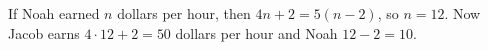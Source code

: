 If Noah earned $n$ dollars per hour, then $4n+2=5(n-2)$, so $n=12$. Now Jacob earns $4\cdot12+2=\boxed{50}$ dollars per hour and Noah $12-2=\boxed{10}$.
